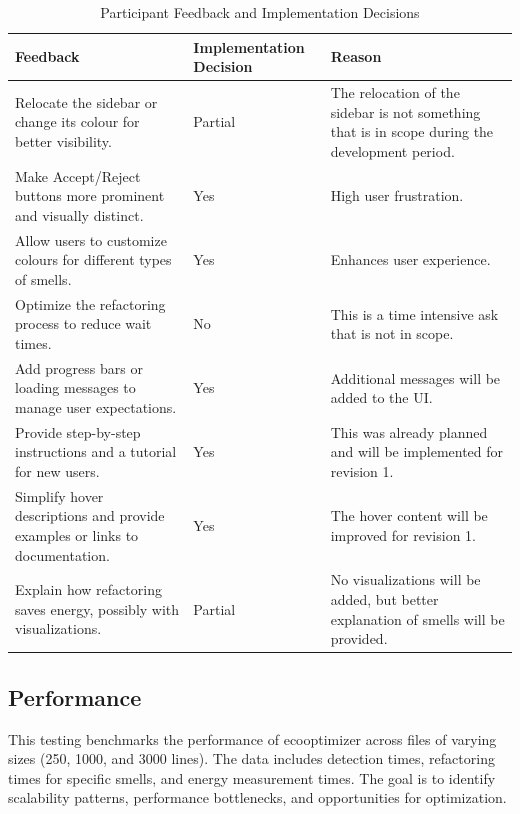 \documentclass[12pt, titlepage]{article}
\begin{document}
\begin{table}[H]
  \centering
  \begin{tabular}{>{\raggedright\arraybackslash}p{6cm}p{3.2cm}>{\raggedright\arraybackslash}p{5cm}}
    \toprule \textbf{Feedback} & \textbf{Implementation Decision} &
    \textbf{Reason} \\
    \midrule
    Relocate the sidebar or change its colour for better visibility.
    & Partial & The relocation of the sidebar is not something that
    is in scope during the development period. \\
    Make Accept/Reject buttons more prominent and visually distinct.
    & Yes & High user frustration. \\
    Allow users to customize colours for different types of smells. &
    Yes & Enhances user experience. \\
    Optimize the refactoring process to reduce wait times. & No &
    This is a time intensive ask that is not in scope. \\
    Add progress bars or loading messages to manage user
    expectations. & Yes & Additional messages will be added to the UI.\\
    Provide step-by-step instructions and a tutorial for new users. &
    Yes & This was already planned and will be implemented for revision 1. \\
    Simplify hover descriptions and provide examples or links to
    documentation. & Yes & The hover content will be improved for revision 1. \\
    Explain how refactoring saves energy, possibly with
    visualizations. & Partial & No visualizations will be added, but
    better explanation of smells will be provided. \\
    \bottomrule
  \end{tabular}
  \caption{Participant Feedback and Implementation Decisions}
\end{table}

\subsection{Performance}

This testing benchmarks the performance of ecooptimizer across
files of varying sizes (250, 1000, and 3000 lines). The data includes
detection times,
refactoring times for specific smells, and energy measurement times.
The goal is to
identify scalability patterns, performance bottlenecks, and
opportunities for optimization.\\
\end{document}
